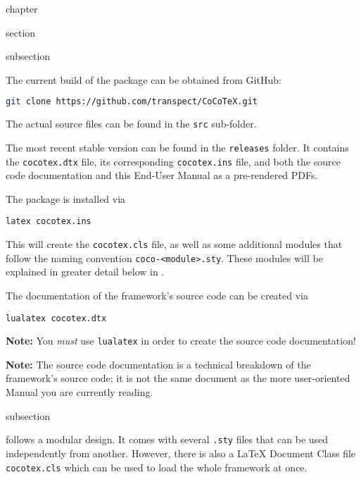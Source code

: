 \begin{Heading}{chapter}
\end{Heading}

\begin{Heading}{section}
\end{Heading}

\begin{Heading}{subsection}
\end{Heading}

The current build of the package can be obtained from GitHub:
\begin{lstlisting}[style=tex,language=bash]
git clone https://github.com/transpect/CoCoTeX.git
\end{lstlisting}
The actual source files can be found in the \lstinline{src} sub-folder.

The most recent stable version can be found in the
\lstinline{releases} folder. It contains the \lstinline{cocotex.dtx}
file, its corresponding \lstinline{cocotex.ins} file, and both the source code documentation and this
End-User Manual as a pre-rendered PDFs.

The package is installed via
\begin{lstlisting}[style=bash]
latex cocotex.ins
\end{lstlisting}
This will create the \lstinline{cocotex.cls} file, as well as some
additional modules that follow the naming convention
\lstinline{coco-<module>.sty}. These modules will be explained in
greater detail below in .

The documentation of the framework's source code can be created via
\begin{lstlisting}[style=bash]
lualatex cocotex.dtx
\end{lstlisting}
\textbf{Note:} You \textit{must} use \lstinline{lualatex} in order to
create the source code documentation!

\textbf{Note:} The source code documentation is a technical breakdown
of the framework's source code; it is not the same document as the
more user-oriented Manual you are currently reading.

\begin{Heading}{subsection}
\end{Heading}

{\CoCoTeX} follows a modular design. It comes with several
\lstinline{.sty} files that can be used independently from
another. However, there is also a {\LaTeX} Document Class file
\lstinline{cocotex.cls} which can be used to load the whole framework
at once.

